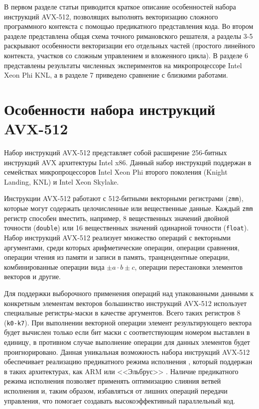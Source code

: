 \documentclass[utf8]{psta}
\begin{document}
В первом разделе статьи приводится краткое описание особенностей набора инструкций AVX-512, позволящих выполнять векторизацию сложного программного контекста с помощью предикатного представления кода.
Во втором разделе представлена общая схема точного римановского решателя, а разделы 3-5 раскрывают особенности векторизации его отдельных частей (простого линейного контекста, участков со сложным управлением и вложенного цикла).
В разделе 6 представлены результаты численных экспериментов на микропроцессоре Intel Xeon Phi KNL, а в разделе 7 приведено сравнение с близкими работами.

\section{Особенности набора инструкций AVX-512}

Набор инструкций AVX-512 представляет собой расширение 256-битных инструкций AVX архитектуры Intel x86.
Данный набор инструкций поддержан в семействах микропроцессоров Intel Xeon Phi второго поколения (Knight Landing, KNL) и Intel Xeon Skylake.

Инструкции AVX-512 работают с 512-битными векторными регистрами (\texttt{zmm}), которые могут содержать целочисленные или вещественные данные.
Каждый \texttt{zmm} регистр способен вместить, например, 8 вещественных значений двойной точности (\texttt{double}) или 16 вещественных значений одинарной точности (\texttt{float}).
Набор инструкций AVX-512 реализует множество операций с векторными аргументами, среди которых арифметические операции, операции сравнения, операции чтения из памяти и записи в память, транцендентные операции, комбинированные операции вида $\pm a \cdot b \pm c$, операции перестановки элементов векторов и другие.

Для поддержки выборочного применения операций над упакованными данными к конкретным элементам векторов большинство инструкций AVX-512 использует специальные регистры-маски в качестве аргументов.
Всего таких регистров 8 (\texttt{k0-k7}).
При выполнении векторной операции элемент результирующего вектора будет вычислен только если бит маски с соответствующим номером выставлен в единицу, в противном случае выполнение операции для данных элементов будет проигнорировано.
Данная уникальная возможность набора инструкций AVX-512 обеспечивает реализацию предикатного режима исполнения \cite{VolOkuPred}, который поддержан в таких архитектурах, как ARM или <<Эльбрус>> \cite{KimElbrus}.
Наличие предикатного режима исполнения позволяет применять оптимизацию слияния ветвей исполнения и, таким образом, избавляться от лишних операций передачи управления, что помогает создавать высокоэффективный параллельный код.
\end{document}

